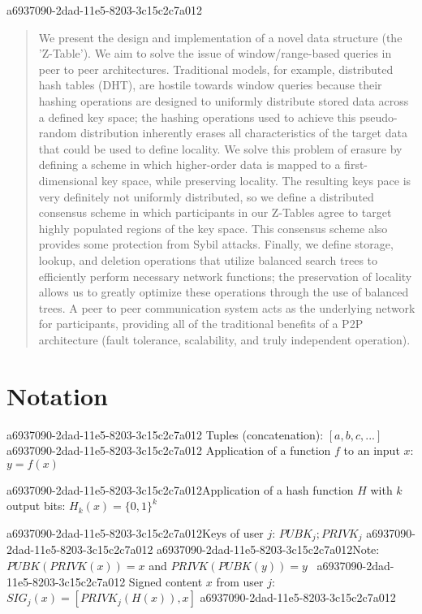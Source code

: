 \documentclass[12pt]{article}
\begin{document}
a6937090-2dad-11e5-8203-3c15c2c7a012\maketitle

\begin{abstract}
We present the design and implementation of a novel data structure (the 'Z-Table'). We aim to solve the issue of window/range-based queries in peer to peer architectures. Traditional models, for example,  distributed hash tables (DHT), are hostile towards window queries because their hashing operations are designed to uniformly distribute stored data across a defined key space; the hashing operations used to achieve this pseudo-random distribution inherently erases all characteristics of the target data that could be used to define locality. We solve this problem of erasure by defining a scheme in which higher-order data is mapped to a first-dimensional key space, while preserving locality. The resulting keys pace is very definitely not uniformly distributed, so we define a distributed consensus scheme in which participants in our Z-Tables agree to target highly populated regions of the key space. This consensus scheme also provides some protection from Sybil attacks. Finally, we define storage, lookup, and deletion operations that utilize balanced search trees to efficiently perform necessary network functions; the preservation of locality allows us to greatly optimize these operations through the use of balanced trees. A peer to peer communication system acts as the underlying network for participants, providing all of the traditional benefits of a P2P architecture (fault tolerance, scalability, and truly independent operation).
\end{abstract}

\section{Notation}
a6937090-2dad-11e5-8203-3c15c2c7a012
Tuples (concatenation): $[a,b,c,...]$
a6937090-2dad-11e5-8203-3c15c2c7a012
Application of a function $f$ to an input $x$: $y=f(x)$

a6937090-2dad-11e5-8203-3c15c2c7a012Application of a hash function $H$ with $k$ output bits: $H_{k}(x) = \{0,1\}^k$

a6937090-2dad-11e5-8203-3c15c2c7a012Keys of user $j$: $ PUBK_j; PRIVK_j $
a6937090-2dad-11e5-8203-3c15c2c7a012
a6937090-2dad-11e5-8203-3c15c2c7a012Note: $PUBK(PRIVK(x)) = x$ and $PRIVK(PUBK(y)) = y$~
a6937090-2dad-11e5-8203-3c15c2c7a012
Signed content $x$ from user $j$: $SIG_j(x) = \left[ PRIVK_j( H(x) ), x \right]$
a6937090-2dad-11e5-8203-3c15c2c7a012
\end{document}

